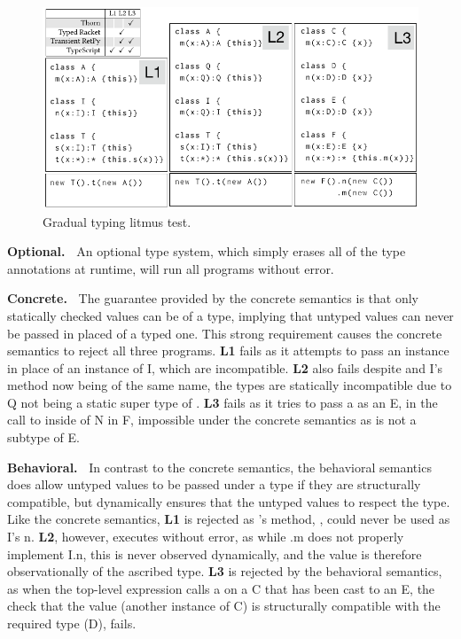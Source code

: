 \documentclass[a4paper,USenglish]{tex/lipics-v2016}
\begin{document}
\begin{figure}[!h]
  \includegraphics[width=.95\columnwidth]{../figures/litm}
  \caption{Gradual typing litmus test.}\label{litmus}
\end{figure}

{\bf Optional.~} An optional type system, which simply erases all of the
type annotations at runtime, will run all programs without error.

{\bf Concrete.~} The guarantee provided by the concrete semantics is that
only statically checked values can be of a type, implying that untyped
values can never be passed in placed of a typed one. This strong requirement
causes the concrete semantics to reject all three programs. {\bf L1} fails
as it attempts to pass an \A instance in place of an instance of \xt I,
which are incompatible.  {\bf L2} also fails despite \A and \xt I's
method now being of the same name, the types are statically incompatible due
to \xt Q not being a static super type of \A. {\bf L3} fails as it tries to
pass a \C as an \xt E, in the call to \m inside of \xt N in \xt F,
impossible under the concrete semantics as \C is not a subtype of \xt E.

{\bf Behavioral.~} In contrast to the concrete semantics, the behavioral
semantics does allow untyped values to be passed under a type if they are
structurally compatible, but dynamically ensures that the untyped values to
respect the type. Like the concrete semantics, {\bf L1} is rejected as \A's
method, \m, could never be used as \xt I's \xt n. {\bf L2}, however,
executes without error, as while \A.\xt m does not properly implement \xt
I.\xt n, this is never observed dynamically, and the value is therefore
observationally of the ascribed type. {\bf L3} is rejected by the behavioral
semantics, as when the top-level expression calls \xt a on a \xt C that has
been cast to an \xt E, the check that the value (another instance of \xt C)
is structurally compatible with the required type (\xt D), fails.
\end{document}
